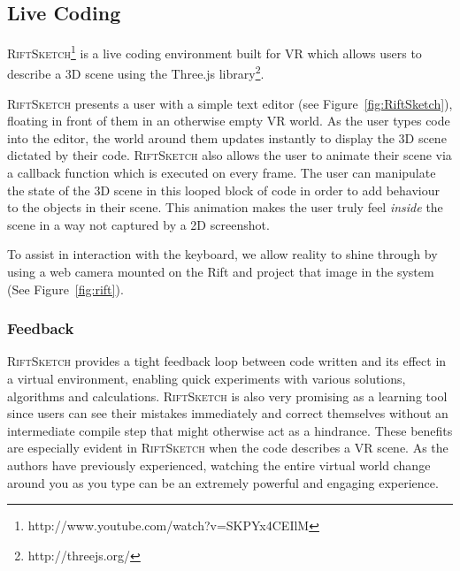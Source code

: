 \documentclass[conference]{IEEEtran}
\begin{document}
\subsection{Live Coding}

\textsc{RiftSketch}\footnote{http://www.youtube.com/watch?v=SKPYx4CEIlM} is a live coding environment built for VR which allows users to describe a 3D scene using the Three.js library\footnote{http://threejs.org/}.

\textsc{RiftSketch} presents a user with a simple text editor (see Figure~\ref{fig:RiftSketch}), floating in front of them in an otherwise empty VR world. 
As the user types code into the editor, the world around them updates instantly to display the 3D scene dictated by their code. 
\textsc{RiftSketch} also allows the user to animate their scene via a callback function which is executed on every frame. 
The user can manipulate the state of the 3D scene in this looped block of code in order to add behaviour to the objects in their scene.
This animation makes the user truly feel \emph{inside} the scene in a way not captured by a 2D screenshot.

To assist in interaction with the keyboard, we allow reality to shine through by using a web camera mounted on the Rift and project that image in the system (See Figure~\ref{fig:rift}).



\subsubsection{Feedback}

\textsc{RiftSketch} provides a tight feedback loop between code written and its effect in a virtual environment, enabling quick experiments with various solutions, algorithms and calculations. 
\textsc{RiftSketch} is also very promising as a learning tool since users can see their mistakes immediately and correct themselves without an intermediate compile step that might otherwise act as a hindrance.  
These benefits are especially evident in \textsc{RiftSketch} when the code describes a VR scene. 
As the authors have previously experienced, watching the entire virtual world change around you as you type can be an extremely powerful and engaging experience.
\end{document}
